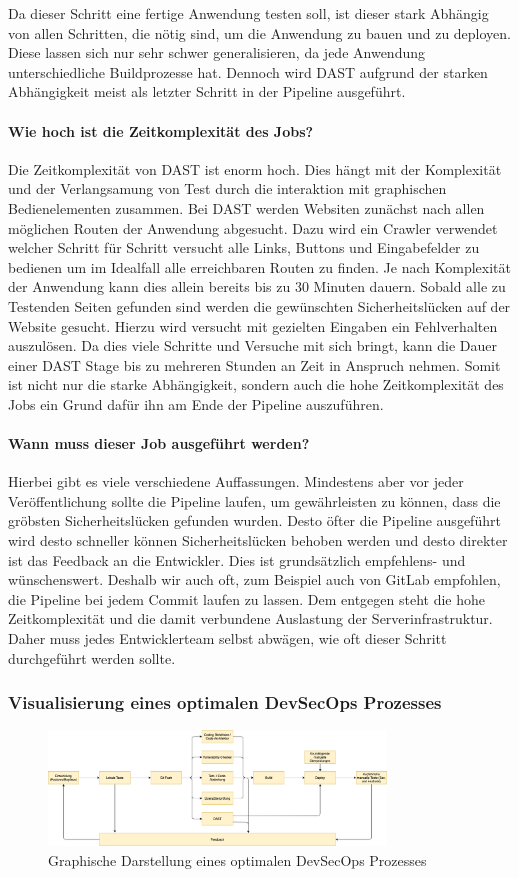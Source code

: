 Da dieser Schritt eine fertige Anwendung testen soll, ist dieser stark Abhängig von allen Schritten, die nötig sind, um die Anwendung zu bauen und zu deployen.
Diese lassen sich nur sehr schwer generalisieren, da jede Anwendung unterschiedliche Buildprozesse hat.
Dennoch wird DAST aufgrund der starken Abhängigkeit meist als letzter Schritt in der Pipeline ausgeführt.

\paragraph{Wie hoch ist die Zeitkomplexität des Jobs?}

Die Zeitkomplexität von DAST ist enorm hoch.
Dies hängt mit der Komplexität und der Verlangsamung von Test durch die interaktion mit graphischen Bedienelementen zusammen.
Bei DAST werden Websiten zunächst nach allen möglichen Routen der Anwendung abgesucht.
Dazu wird ein Crawler verwendet welcher Schritt für Schritt versucht alle Links, Buttons und Eingabefelder zu bedienen um im Idealfall alle erreichbaren Routen zu finden.
Je nach Komplexität der Anwendung kann dies allein bereits bis zu 30 Minuten dauern.
Sobald alle zu Testenden Seiten gefunden sind werden die gewünschten Sicherheitslücken auf der Website gesucht.
Hierzu wird versucht mit gezielten Eingaben ein Fehlverhalten auszulösen.
Da dies viele Schritte und Versuche mit sich bringt, kann die Dauer einer DAST Stage bis zu mehreren Stunden an Zeit in Anspruch nehmen.
Somit ist nicht nur die starke Abhängigkeit, sondern auch die hohe Zeitkomplexität des Jobs ein Grund dafür ihn am Ende der Pipeline auszuführen.

\paragraph{Wann muss dieser Job ausgeführt werden?}

Hierbei gibt es viele verschiedene Auffassungen.
Mindestens aber vor jeder Veröffentlichung sollte die Pipeline laufen, um gewährleisten zu können, dass die gröbsten Sicherheitslücken gefunden wurden.
Desto öfter die Pipeline ausgeführt wird desto schneller können Sicherheitslücken behoben werden und desto direkter ist das Feedback an die Entwickler.
Dies ist grundsätzlich empfehlens- und wünschenswert.
Deshalb wir auch oft, zum Beispiel auch von GitLab empfohlen, die Pipeline bei jedem Commit laufen zu lassen.\cite{gitlabSeismicShiftApplication2020}
Dem entgegen steht die hohe Zeitkomplexität und die damit verbundene Auslastung der Serverinfrastruktur.
Daher muss jedes Entwicklerteam selbst abwägen, wie oft dieser Schritt durchgeführt werden sollte.


\subsubsection{Visualisierung eines optimalen DevSecOps Prozesses}
\begin{figure}[H]
    \includegraphics[width=0.8\textwidth]{img/DevOpsWorkflow}
    \centering
    \caption{Graphische Darstellung eines optimalen DevSecOps Prozesses}
    \label{fig:devSecOpsProcess}
\end{figure}